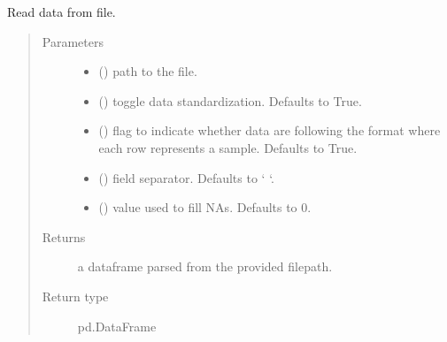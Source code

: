 \documentclass[letterpaper,10pt,english]{sphinxmanual}
\begin{document}
\begin{fulllineitems}
\label{\detokenize{_modules/cosifer.utils:cosifer.utils.data.read_data}}
Read data from file.
\begin{quote}\begin{description}
\item[{Parameters}] \leavevmode\begin{itemize}
\item {} 
 () \textendash{} path to the file.

\item {} 
 (\sphinxstyleliteralemphasis{\sphinxupquote{, }}) \textendash{} toggle data standardization.
Defaults to True.

\item {} 
 (\sphinxstyleliteralemphasis{\sphinxupquote{, }}) \textendash{} flag to indicate whether data are
following the format where each row represents a sample.
Defaults to True.

\item {} 
 (\sphinxstyleliteralemphasis{\sphinxupquote{, }}) \textendash{} field separator. Defaults to ‘     ‘.

\item {} 
 (\sphinxstyleliteralemphasis{\sphinxupquote{, }}) \textendash{} value used to fill NAs. Defaults to 0.

\end{itemize}

\item[{Returns}] \leavevmode
a dataframe parsed from the provided filepath.

\item[{Return type}] \leavevmode
pd.DataFrame

\end{description}\end{quote}

\end{fulllineitems}
\end{document}
